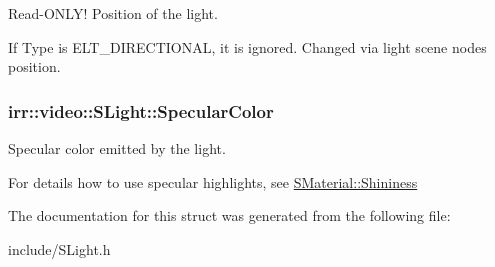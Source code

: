 Read-\/\+O\+N\+L\+Y! Position of the light. 

If Type is E\+L\+T\+\_\+\+D\+I\+R\+E\+C\+T\+I\+O\+N\+AL, it is ignored. Changed via light scene node\textquotesingle{}s position. 
\subsubsection[{\texorpdfstring{Specular\+Color}{SpecularColor}}]{ irr\+::video\+::\+S\+Light\+::\+Specular\+Color}\hypertarget{structirr_1_1video_1_1SLight_a2d66ad28850a8588b2ba727103710604}{}\label{structirr_1_1video_1_1SLight_a2d66ad28850a8588b2ba727103710604}


Specular color emitted by the light. 

For details how to use specular highlights, see \hyperlink{classirr_1_1video_1_1SMaterial_a877106a83108db6d1f30a38379d28494}{S\+Material\+::\+Shininess} 

The documentation for this struct was generated from the following file\+:\begin{DoxyCompactItemize}
\item 
include/S\+Light.\+h\end{DoxyCompactItemize}
